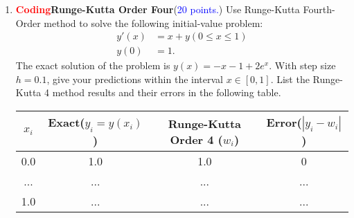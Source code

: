\documentclass[11pt]{article}
\begin{document}
\begin{enumerate}
\item \textbf{\textcolor{red}{Coding}Runge-Kutta Order Four}(\textcolor{blue}{20 points.}) 
Use Runge-Kutta Fourth-Order method to solve the following initial-value problem:
\begin{equation}
\begin{aligned}
    y'(x)&=x+y(0\leq x\leq1)\\
    y(0)&=1.
\end{aligned}
\end{equation}
The exact solution of the problem is $y(x) = -x-1+2e^x$.
With step size $h=0.1$, give your predictions within the interval $x\in [0,1]$. List the Runge-Kutta 4 method results and their errors in the following table. 
\begin{center}
\begin{tabular}{||c c c c||} 
 \hline
 $x_i$ & Exact($y_i = y(x_i)$) & Runge-Kutta Order 4 ($w_i$) & Error($|y_i-w_i|$) \\ [0.5ex] 
 \hline\hline
 0.0 & 1.0 & 1.0 & 0 \\
 \hline
 ... & ... & ... & ... \\
 \hline
  1.0 & ... & ... & ... \\[1ex] 
 \hline
\end{tabular}
\end{center}



\end{enumerate}
\end{document}
